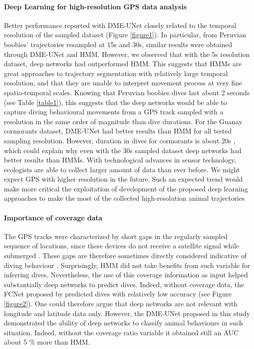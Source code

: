 \documentclass{article}
\begin{document}
\paragraph{Deep Learning for high-resolution GPS data analysis}
Better performance reported with DME-UNet closely related to the temporal resolution of the sampled dataset (Figure \ref{figure1}). 
In particular, from Peruvian boobies' trajectories resampled at 15s and 30s, similar results were obtained through DME-UNet and HMM. However, we observed that with the 5s resolution dataset, deep networks had outperformed HMM. This suggests that HMMs are great approaches to trajectory segmentation with relatively large temporal resolution, and that they are unable to interpret movement process at very fine spatio-temporal scales. Knowing that Peruvian boobies dives last about 2 seconds (see Table \ref{table1}), this suggests that the deep networks would be able to capture diving behavioural movements from a GPS track sampled with a resolution in the same order of magnitude than dive durations. 
For the Guanay cormorants dataset, DME-UNet had better results than HMM for all tested sampling resolution. However, duration in dives for cormorants is about 20s \citep{weimerskirch_foraging_2012}, which could explain why even with the 30s sampled dataset deep networks had better results than HMMs. With technological advances in sensor technology, ecologists are able to collect larger amount of data than ever before. We might expect GPS with higher resolution in the future. Such an expected trend would make more critical the exploitation of development of the proposed deep learning approaches to make the most of the collected high-resolution  animal trajectories   \citep{malde_machine_2020, yoda_advances_2019}

\paragraph{Importance of coverage data}
The GPS tracks were characterized by short gaps in the regularly sampled sequence of locations, since these devices do not receive a satellite signal while submerged \citep{boyd_movement_2014,wilson_technological_2012}.
These gaps are therefore sometimes directly considered indicative of diving behaviour \citep{weimerskirch_foraging_2012}.
Surprisingly, HMM did not take benefits from such variable for inferring dives. 
Nevertheless, the use of this coverage information as input helped substantially deep networks to predict dives. 
Indeed, without coverage data, the FCNet proposed by \citep{browning_predicting_2018} predicted dives with relatively low accuracy (see Figure \ref{figure2}). One could therefore argue that deep networks are not relevant with longitude and latitude data only. However, the DME-UNet proposed in this study demonstrated the ability of deep networks to classify animal behaviours in such situation. Indeed, without the coverage ratio variable it obtained still an AUC about 5 \% more than HMM.
\end{document}

